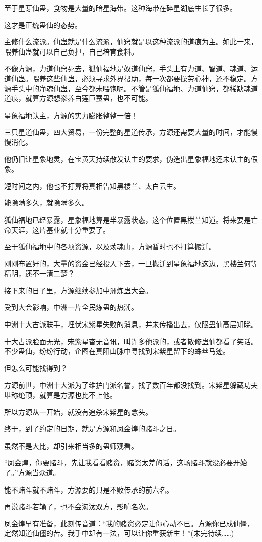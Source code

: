 \begin{this_body}
至于星芽仙蛊，食物是大量的暗星海带。这种海带在碎星湖底生长了很多。

这才是正统蛊仙的态势。

主修什么流派。仙蛊就是什么流派，仙窍就是以这种流派的道痕为主。如此一来，喂养仙蛊就可以自己负担，自己培育食料。

不像方源，力道仙窍死去，狐仙福地是奴道仙窍，手头上有力道、智道、魂道、运道仙蛊。喂养这些仙蛊，必须寻求外界帮助，每一次都要操劳心神，还不稳定。方源手头中的净魂仙蛊，至今都未喂饱呢。不管是狐仙福地、力道仙窍，都稀缺魂道道痕，就算方源想豢养白莲巨蚕蛊，也不可能。

星象福地认主，方源的实力膨胀整整一倍！

三只星道仙蛊，四大贸易，一份完整的星道传承，方源还需要大量的时间，才能慢慢消化。

他仍旧让星象地灵，在宝黄天持续散发认主的要求，伪造出星象福地还未认主的假象。

短时间之内，他也不打算将真相告知黑楼兰、太白云生。

能隐瞒多久，就隐瞒多久。

狐仙福地已经暴露，星象福地算是半暴露状态，这个位置黑楼兰知道。将来要是亡命天涯，这片基业就十分重要了。

至于狐仙福地中的各项资源，以及荡魂山，方源暂时也不打算搬迁。

刚刚布置好的，大量的资金已经投入下去，一旦搬迁到星象福地这边，黑楼兰何等精明，还不一清二楚？

接下来的日子里，方源继续参加中洲炼蛊大会。

受到大会影响，中洲一片全民炼蛊的热潮。

中洲十大古派联手，埋伏宋紫星失败的消息，并未传播出去，仅限蛊仙高层知晓。

十大古派脸面无光，宋紫星杳无音讯，叫许多他派的，或者散修蛊仙都看了笑话。不少蛊仙，纷纷行动，企图在真阳山脉中寻找到宋紫星留下的蛛丝马迹。

但怎么可能找得到？

方源前世，中洲十大派为了维护门派名誉，找了数百年都没找到。宋紫星躲藏功夫堪称绝顶，就算是方源也比不上他。

所以方源从一开始，就没有追杀宋紫星的念头。

终于，到了约定的日期，就是方源和凤金煌的赌斗之日。

虽然不是大比，却引来相当多的蛊师观看。

“凤金煌，你要赌斗，先让我看看赌资，赌资太差的话，这场赌斗就没必要开始了。”方源当众道。

能不赌斗就不赌斗，方源要的只是不败传承的前六名。

再说赌斗若输了，也不会淘汰双方，影响名次。

凤金煌早有准备，此刻传音道：“我的赌资必定让你心动不已。方源你已成仙僵，定然知道仙僵的苦。我手中却有一法，可以让你重获新生！”(未完待续……)

\end{this_body}

